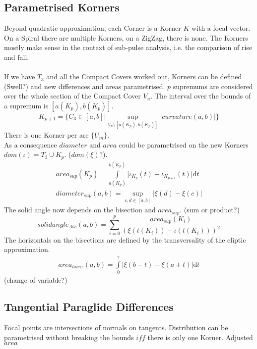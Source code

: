 \documentclass[a4paper,landscape]{report}
\begin{document}
\subsection{Parametrised Korners}
Beyond quadratic approximation, each Corner is a Korner $K$ with a focal vector. On a Spiral there are multiple Korners, on a ZigZag, there is none. The Korners mostly make sense in the context of sub-pulse analysis, i.e. the comparison of rise and fall.\\\\
If we have $T_{3}$ and all the Compact Covers worked out, Korners can be defined (Swell?) and new differences and areas parametrised. $p$ supremums are considered over the whole section of the Compact Cover $V_{n}$. The interval over the bounds of a supremum is $[a(K_{p}),b(K_{p})]$.
\begin{align}
K_{p+1} = \{ C_{3} \in  [a,b]\vert \sup \limits _{V_{n} \setminus [a(K_{p}),b(K_{p})]} \lvert curvature(a,b) \rvert \}
\end{align}
There is one Korner per arc $\{U_{m}\}$.\\
As a consequence $diameter$ and $area$ could be parametrised on the new Korners $dom(\iota)=T_{3}\cup K_{p}$. ($dom(\xi)$?).\\
\begin{align}
area_{sup}(K_{p})=\int \limits _{a(K_{p})}^{b(K_{p})} \lvert \iota_{K_{p}}(t)-\iota_{K_{p+1}}(t) \rvert \mathrm{d}t\\
diameter_{sup}(a,b)=\sup \limits _{c,d \in [a,b]} \lvert \xi(d) - \xi(c) \rvert
\end{align}
The solid angle now depends on the bisection and $area_{sup}$. (sum or product?)
\begin{equation}
solidangle_{Abs}(a,b)=\sum \limits _{i=0}^{p} \frac{area_{sup}(K_{i})}{(\xi(t(K_{i}))-\iota(t(K_{i})))^2}
\end{equation}
The horizontals on the bisections are defined by the transversality of the eliptic approximation.
\begin{align}
area_{horiz}(a,b)=\int \limits _{0}^{?} \lvert \xi(b-t)-\xi(a+t) \rvert \mathrm{d}t
\end{align}
(change of variable?)
\subsection{Tangential Paraglide Differences}
Focal points are intersections of normals on tangents. Distribution can be parametrised without breaking the bounds $iff$ there is only one Korner. Adjusted $area$

\iffalse
\printbibliography
\fi
{}

\end{document}
